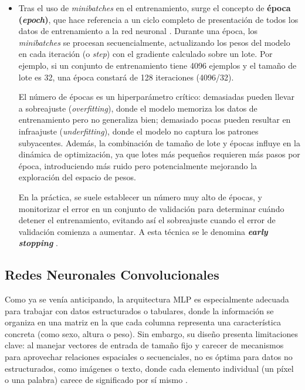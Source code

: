 \begin{itemize}
    \item Tras el uso de \textit{minibatches} en el entrenamiento, surge el concepto de \textbf{época 
    (\textit{epoch})}, que hace referencia a un ciclo completo de presentación de todos los datos de 
    entrenamiento a la red neuronal \cite{rusell2021}. Durante una época, los \textit{minibatches} se procesan 
    secuencialmente, actualizando los pesos del modelo en cada iteración (o \textit{step}) con el gradiente 
    calculado sobre un lote. Por ejemplo, si un conjunto de entrenamiento tiene 4096 ejemplos y el tamaño de 
    lote es 32, una época constará de 128 iteraciones (4096/32).

    El número de épocas es un hiperparámetro crítico: demasiadas pueden llevar a sobreajuste 
    (\textit{overfitting}), donde el modelo memoriza los datos de entrenamiento pero no generaliza bien; 
    demasiado pocas pueden resultar en infraajuste (\textit{underfitting}), donde el modelo no captura los 
    patrones subyacentes. Además, la combinación de tamaño de lote y épocas influye en la dinámica de 
    optimización, ya que lotes más pequeños requieren más pasos por época, introduciendo más ruido pero 
    potencialmente mejorando la exploración del espacio de pesos.

    En la práctica, se suele establecer un número muy alto de épocas, y monitorizar el error en un conjunto de
    validación para determinar cuándo detener el entrenamiento, evitando así el sobreajuste cuando el error de
    validación comienza a aumentar. A esta técnica se le denomina \textbf{\textit{early stopping}} 
    \cite{goodfellow2016}.
    
\end{itemize}



\subsection{Redes Neuronales Convolucionales}

Como ya se venía anticipando, la arquitectura MLP es especialmente adecuada para trabajar con datos 
estructurados o tabulares, donde la información se organiza en una matriz en la que cada columna representa 
una característica concreta (como sexo, altura o peso). 
Sin embargo, su diseño presenta limitaciones clave: al manejar vectores de entrada de tamaño fijo y carecer 
de mecanismos para aprovechar relaciones espaciales o secuenciales, no es óptima para datos no estructurados, 
como imágenes o texto, donde cada elemento individual (un píxel o una palabra) carece de significado por sí 
mismo \cite{murphy2022}.

